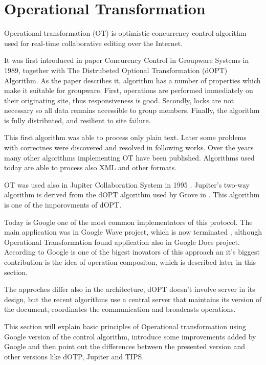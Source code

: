 \documentclass[12pt,oneside]{fithesis2}
\begin{document}
\section{Operational Transformation}
\par Operational transformation (OT) is optimistic concurrency control algorithm used for real-time collaborative editing over the Internet. 
\par It was first introduced in paper Concurency Control in Groupware Systems \cite{Ellis} in 1989, together with The Distrubeted Optional Transformation (dOPT) Algorithm. As the paper describes it, algorithm has a number of properties which make it suitable for groupware. First, operations are performed immediately on their originating site, thus responsiveness is good. Secondly, locks are not necessary so all data remains accessible to group members. Finally, the algorithm is fully distributed, and resilient to site failure. \par This first algorithm was able to process only plain text. Later some problems with correctnes were discovered and resolved in following works. Over the years many other algorithms implementing OT have been published. Algorithms used today are able to process also XML and other formats. \par OT was used also in Jupiter Collaboration System in 1995 \cite{Jupiter}. Jupiter's two-way algorithm is derived from the dOPT algorithm used by Grove in \cite{Ellis}. This algorithm is one of the imporovments of dOPT. \par Today is Google one of the most common implementators of this protocol. The main application was in Google Wave project, which is now terminated , although Operational Transformation found application also in Google Docs project. According to \cite{Spiewak} Google is one of the bigest inovators of this approach an it's biggest contribution is the idea of operation compositon, which is described later in this section. \par The approches differ also in the architecture, dOPT doesn't involve server in its design, but the recent algorithms use a central server that maintains its version of the document, coordinates the communication and broadcasts operations.
\par This section will explain basic principles of Operational transformation using Google version of the control algorithm, introduce some improvements added by Google and then point out the differences between the presented version and other versions like dOTP, Jupiter and TIPS. 
\end{document}
